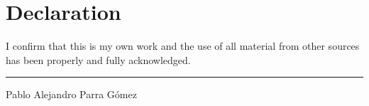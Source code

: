 \chapter*{Declaration}

I confirm that this is my own work and the use of all material from other sources has been properly and fully acknowledged.

\vspace{5cm}

\noindent\rule{20em}{0.4pt}

Pablo Alejandro Parra Gómez 